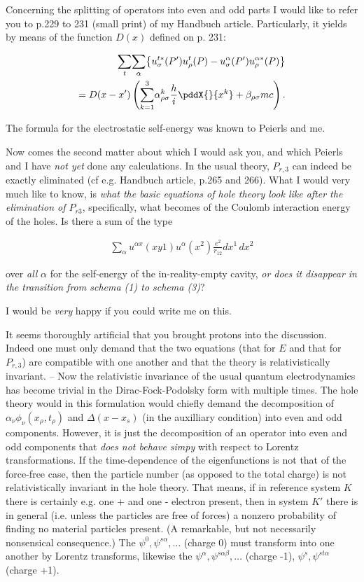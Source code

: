 \documentclass{article}
\newcommand{\uequ}[1]{
\begin{align*}
#1
\end{align*}
}
\newcommand{\sumXY}[2]{\underset{#1}{\overset{#2}{\sum}}}
\newcommand{\sumX}[1]{\underset{#1}{\sum}}
\begin{document}
Concerning the splitting of operators into even and odd parts I would like to refer you to p.229 to 231 (small print) of my Handbuch article. Particularly, it yields by means of the function $D(x)$ defined on p. 231:
\uequ{
\sumX{t}{\sumX{\alpha}{\left\{
u^{t*}_\sigma(P') u^t_\rho(P) - u^\alpha_\sigma(P') u^{\alpha*}_\rho(P)\right\}}}\\
= D(x-x')\left(\sumXY{k=1}{3}{
\alpha^k_{\rho\sigma}\frac{h}{i}\pddX{}{x^k} + \beta_{\rho\sigma}mc
}\right).
}
The formula for the electrostatic self-energy was known to Peierls and me.

Now comes the second matter about which I would ask you, and which Peierls and I have \textit{not yet} done any calculations. In the usual theory, $P_{r,3}$ can indeed be exactly eliminated (cf e.g. Handbuch article, p.265 and 266). What I would very much like to know, is \textit{what the basic equations of hole theory look like after the elimination of $P_{r3}$}, specifically, what becomes of the Coulomb interaction energy of the holes. Is there a sum of the type
\uequ{
\sumX{\alpha}{u^{\alpha x}(xy1)u^{\alpha}(x^2)\frac{e^2}{r_{12}}{dx^1}\,{dx^2}}
}
over \textit{all} $\alpha$ for the self-energy of the in-reality-empty cavity, \textit{or does it disappear in the transition from schema (1) to schema (3)}?

I would be \textit{very} happy if you could write me on this.

It seems thoroughly artificial that you brought protons into the discussion. Indeed one must only demand that the two equations (that for $E$ and that for $P_{r,3}$) are compatible with one another and that the theory is relativistically invariant. -- Now the relativistic invariance of the usual quantum electrodynamics has become trivial in the Dirac-Fock-Podolsky form with multiple times. The hole theory would in this formulation would chiefly demand the decomposition of $\alpha_\nu \phi_\nu(x_\rho,t_\rho)$ and $\Delta(x-x_s)$ (in the auxilliary condition) into even and odd components. However, it is just the decomposition of an operator into even and odd components that \textit{does not behave simpy} with respect to Lorentz transformations. If the time-dependence of the eigenfunctions is not that of the force-free case, then the particle number (as opposed to the total charge) is not relativistically invariant in the hole theory. That means, if in reference system $K$ there is certainly e.g. one + and one - electron present, then in system $K'$ there is in general (i.e. unless the particles are free of forces) a nonzero probability of finding no material particles present. (A remarkable, but not necessarily nonsensical consequence.) The $\psi^0, \psi^{s\alpha},\dots$ (charge 0) must transform into one another by Lorentz transforms, likewise the $\psi^\alpha,\psi^{s\alpha\beta},\dots$ (charge -1), $\psi^s, \psi^{st\alpha}$ (charge +1).
\end{document}
